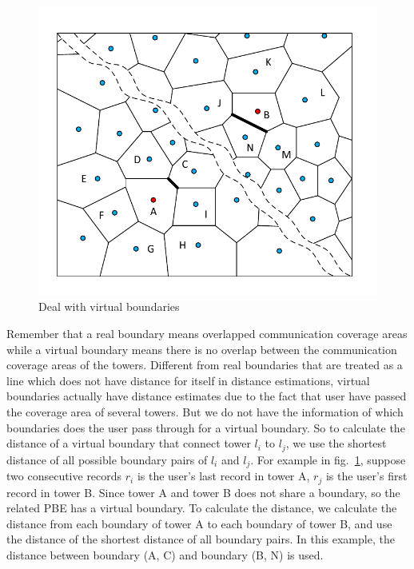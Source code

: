 \begin{figure}[h]
    \centering
    \includegraphics[width=\linewidth]{./figures/virtual_boundary.pdf}
    \caption{Deal with virtual boundaries}
		\label{fig:virtual}
\end{figure}

Remember that a real boundary means overlapped communication coverage areas while a virtual boundary means there is no overlap between the communication coverage areas of the towers. Different from real boundaries that are treated as a line which does not have distance for itself in distance estimations, virtual boundaries actually have distance estimates due to the fact that user have passed the coverage area of several towers. But we do not have the information of which boundaries does the user pass through for a virtual boundary. So to calculate the distance of a virtual boundary that connect tower $l_i$ to $l_j$, we use the shortest distance of all possible boundary pairs of $l_i$ and $l_j$. For example in fig.~\ref{fig:virtual}, suppose two consecutive records $r_i$ is the user's last record in tower A, $r_j$ is the user's first record in tower B. Since tower A and tower B does not share a boundary, so the related PBE has a virtual boundary. To calculate the distance, we calculate the distance from each boundary of tower A to each boundary of tower B, and use the distance of the shortest distance of all boundary pairs. In this example, the distance between boundary (A, C) and boundary (B, N) is used.

